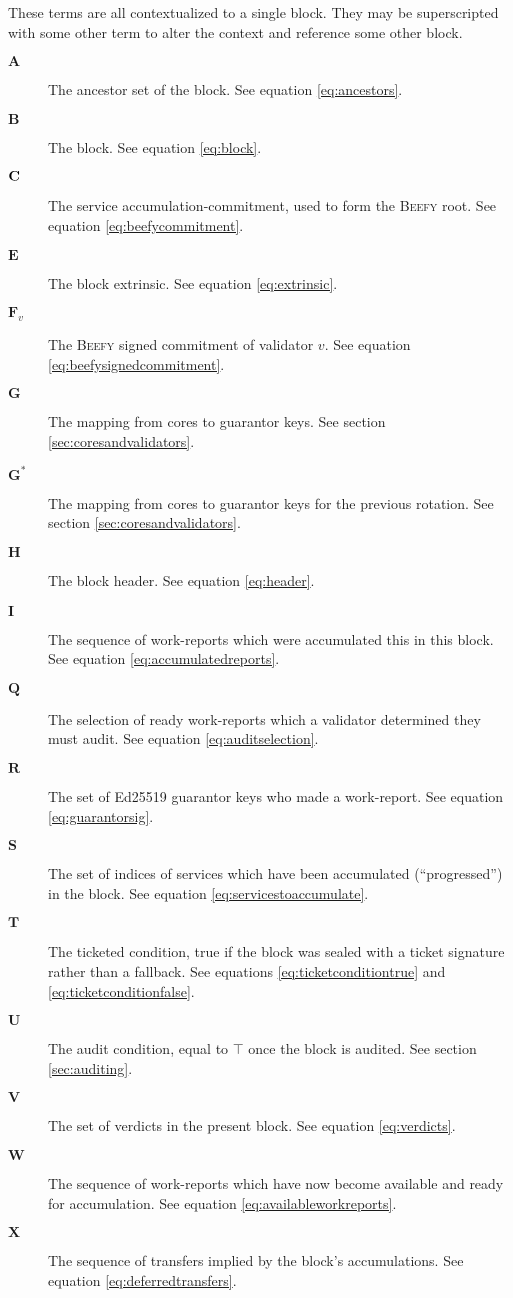 These terms are all contextualized to a single block. They may be superscripted with some other term to alter the context and reference some other block.
\begin{description}
  \item[$\mathbf{A}$] The ancestor set of the block. See equation \ref{eq:ancestors}.
  \item[$\mathbf{B}$] The block. See equation \ref{eq:block}.
  \item[$\mathbf{C}$] The service accumulation-commitment, used to form the \textsc{Beefy} root. See equation \ref{eq:beefycommitment}.
  \item[$\mathbf{E}$] The block extrinsic. See equation \ref{eq:extrinsic}.
  \item[$\mathbf{F}_v$] The \textsc{Beefy} signed commitment of validator $v$. See equation \ref{eq:beefysignedcommitment}.
  \item[$\mathbf{G}$] The mapping from cores to guarantor keys. See section \ref{sec:coresandvalidators}.
  \item[$\mathbf{G^*}$] The mapping from cores to guarantor keys for the previous rotation. See section \ref{sec:coresandvalidators}.
  \item[$\mathbf{H}$] The block header. See equation \ref{eq:header}.
  \item[$\mathbf{I}$] The sequence of work-reports which were accumulated this in this block. See equation \ref{eq:accumulatedreports}.
  \item[$\mathbf{Q}$] The selection of ready work-reports which a validator determined they must audit. See equation \ref{eq:auditselection}.
  \item[$\mathbf{R}$] The set of Ed25519 guarantor keys who made a work-report. See equation \ref{eq:guarantorsig}.
  \item[$\mathbf{S}$] The set of indices of services which have been accumulated (``progressed'') in the block. See equation \ref{eq:servicestoaccumulate}.
  \item[$\mathbf{T}$] The ticketed condition, true if the block was sealed with a ticket signature rather than a fallback. See equations \ref{eq:ticketconditiontrue} and \ref{eq:ticketconditionfalse}.
  \item[$\mathbf{U}$] The audit condition, equal to $\top$ once the block is audited. See section \ref{sec:auditing}.
  \item[$\mathbf{V}$] The set of verdicts in the present block. See equation \ref{eq:verdicts}.\\
  \item[$\mathbf{W}$] The sequence of work-reports which have now become available and ready for accumulation. See equation \ref{eq:availableworkreports}.
  \item[$\mathbf{X}$] The sequence of transfers implied by the block's accumulations. See equation \ref{eq:deferredtransfers}.\\
\end{description}

